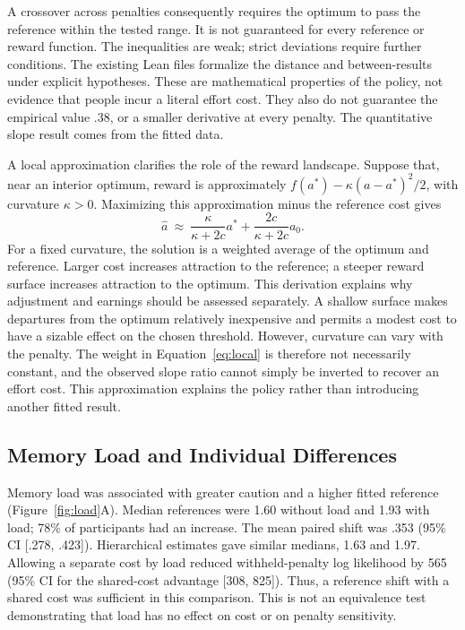 \documentclass[10pt,letterpaper]{article}
\begin{document}
A crossover across penalties consequently requires the optimum to pass the reference within the tested range. It is not guaranteed for every reference or reward function. The inequalities are weak; strict deviations require further conditions. The existing Lean files formalize the distance and between-results under explicit hypotheses. These are mathematical properties of the policy, not evidence that people incur a literal effort cost. They also do not guarantee the empirical value .38, or a smaller derivative at every penalty. The quantitative slope result comes from the fitted data.

A local approximation clarifies the role of the reward landscape. Suppose that, near an interior optimum, reward is approximately $f(a^*)-\kappa(a-a^*)^2/2$, with curvature $\kappa>0$. Maximizing this approximation minus the reference cost gives
\begin{equation}
\hat a\ \approx\ \frac{\kappa}{\kappa+2c}a^*+
\frac{2c}{\kappa+2c}a_0.
\label{eq:local}
\end{equation}
For a fixed curvature, the solution is a weighted average of the optimum and reference. Larger cost increases attraction to the reference; a steeper reward surface increases attraction to the optimum. This derivation explains why adjustment and earnings should be assessed separately. A shallow surface makes departures from the optimum relatively inexpensive and permits a modest cost to have a sizable effect on the chosen threshold. However, curvature can vary with the penalty. The weight in Equation~\ref{eq:local} is therefore not necessarily constant, and the observed slope ratio cannot simply be inverted to recover an effort cost. This approximation explains the policy rather than introducing another fitted result.

\subsection{Memory Load and Individual Differences}
Memory load was associated with greater caution and a higher fitted reference (Figure~\ref{fig:load}A). Median references were 1.60 without load and 1.93 with load; 78\% of participants had an increase. The mean paired shift was .353 (95\% CI [.278, .423]). Hierarchical estimates gave similar medians, 1.63 and 1.97. Allowing a separate cost by load reduced withheld-penalty log likelihood by 565 (95\% CI for the shared-cost advantage [308, 825]). Thus, a reference shift with a shared cost was sufficient in this comparison. This is not an equivalence test demonstrating that load has no effect on cost or on penalty sensitivity.
\end{document}
